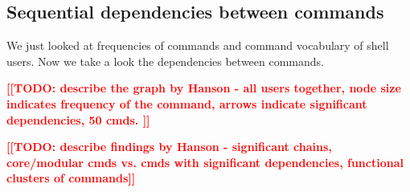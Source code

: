 \documentclass[thesis=M,english]{FITthesis}[2012/10/20]
\newcommand{\todotext}[1]{\textcolor{red}{\textbf{[[#1]]}}}
\begin{document}

\subsection{Sequential dependencies between commands}

We just looked at frequencies of commands and command vocabulary of shell users. Now we take a look the dependencies between commands.

\todotext{TODO: describe the graph by Hanson - all users together, node size indicates frequency of the command, arrows indicate significant dependencies, 50 cmds. }

\todotext{TODO: describe findings by Hanson - significant chains, core/modular cmds vs. cmds with significant dependencies, functional clusters of commands}



\end{document}
